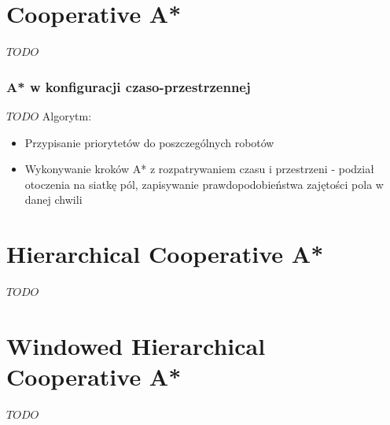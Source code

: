 \section{Cooperative A*}
$TODO$

\subsubsection{A* w konfiguracji czaso-przestrzennej}
$TODO$
Algorytm:
\begin{itemize}
	\item Przypisanie priorytetów do poszczególnych robotów
	\item Wykonywanie kroków A* z rozpatrywaniem czasu i przestrzeni - podział otoczenia na siatkę pól, zapisywanie prawdopodobieństwa zajętości pola w danej chwili
\end{itemize}

\section{Hierarchical Cooperative A*}
$TODO$

\section{Windowed Hierarchical Cooperative A*}
$TODO$
